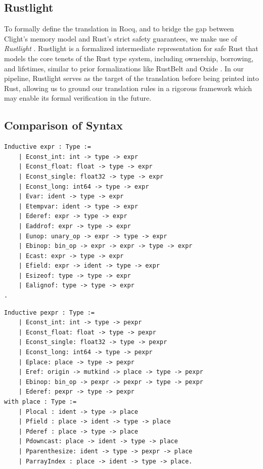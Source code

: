 \documentclass{llncs} %
\begin{document}
\subsection{Rustlight}
To formally define the translation in Rocq, and to bridge the gap between Clight's memory model and Rust's strict safety guarantees, we make use of \emph{Rustlight} \cite{Wu2025}. Rustlight is a formalized intermediate representation for safe Rust that models the core tenets of the Rust type system, including ownership, borrowing, and lifetimes, similar to prior formalizations like RustBelt \cite{Jung2017} and Oxide \cite{Weiss2019}. In our pipeline, Rustlight serves as the target of the translation before being printed into Rust, allowing us to ground our translation rules in a rigorous framework which may enable its formal verification in the future.

\subsection{Comparison of Syntax}
\label{sec:syntax_comparison}

\noindent
\begin{minipage}[t]{0.48\textwidth}
\vspace{-0.5cm}
\begin{lstlisting}[language=Coq, caption={Clight Expressions}, frame=tlrb, label={lst:clight}]
Inductive expr : Type :=
    | Econst_int: int -> type -> expr
    | Econst_float: float -> type -> expr
    | Econst_single: float32 -> type -> expr
    | Econst_long: int64 -> type -> expr
    | Evar: ident -> type -> expr
    | Etempvar: ident -> type -> expr
    | Ederef: expr -> type -> expr
    | Eaddrof: expr -> type -> expr
    | Eunop: unary_op -> expr -> type -> expr
    | Ebinop: bin_op -> expr -> expr -> type -> expr
    | Ecast: expr -> type -> expr
    | Efield: expr -> ident -> type -> expr
    | Esizeof: type -> type -> expr
    | Ealignof: type -> type -> expr
.
\end{lstlisting}
\end{minipage}
\hfill
\begin{minipage}[t]{0.48\textwidth}
\vspace{-0.5cm}
\begin{lstlisting}[language=Coq, caption={Rustlight Expressions}, frame=tlrb, label={lst:rustlight}]
Inductive pexpr : Type :=
    | Econst_int: int -> type -> pexpr
    | Econst_float: float -> type -> pexpr
    | Econst_single: float32 -> type -> pexpr
    | Econst_long: int64 -> type -> pexpr
    | Eplace: place -> type -> pexpr
    | Eref: origin -> mutkind -> place -> type -> pexpr
    | Ebinop: bin_op -> pexpr -> pexpr -> type -> pexpr
    | Ederef: pexpr -> type -> pexpr
with place : Type :=
    | Plocal : ident -> type -> place
    | Pfield : place -> ident -> type -> place
    | Pderef : place -> type -> place
    | Pdowncast: place -> ident -> type -> place
    | Pparenthesize: ident -> type -> pexpr -> place
    | ParrayIndex : place -> ident -> type -> place.
\end{lstlisting}
\end{minipage}
\end{document}
